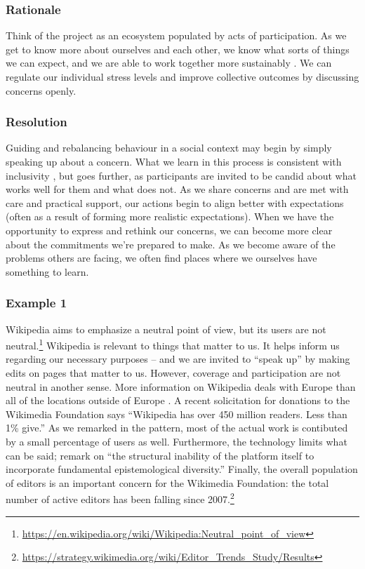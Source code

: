 \subsubsection*{Rationale}

Think of the project as an ecosystem populated by acts of participation.  As we get to know more about ourselves and each other, we know what sorts of things we can expect, and we are able to work together more sustainably \cite{ostrom2010revising}.
%
We can regulate our individual stress levels and improve collective outcomes by discussing concerns openly.

\subsubsection*{Resolution}

Guiding and rebalancing behaviour in a social context may begin by simply speaking up about a concern.  What we learn in this process is  consistent with inclusivity \cite{garrison2013toward}, but goes further, as participants are invited to be candid about what works well for them and what does not.
%
As we share concerns and are met with care and practical support, our actions begin to align better with expectations (often as a result of forming more realistic expectations).  When we have the opportunity to express and rethink our concerns, we can become more clear about the commitments we're prepared to make.  As we become aware of the problems others are facing, we often find places where we ourselves have something to learn.

\subsubsection*{Example 1}
Wikipedia aims to emphasize a neutral point of view, but its users are
not neutral.\footnote{\url{https://en.wikipedia.org/wiki/Wikipedia:Neutral_point_of_view}}
Wikipedia is relevant to things that matter to us.  It
helps inform us regarding our necessary purposes -- and we are invited
to ``speak up'' by making edits on pages that matter to us.  However,
coverage and participation are not neutral in another sense.
More information on Wikipedia deals with Europe than
all of the locations outside of Europe \cite{graham2014uneven}.
A recent solicitation for donations to the Wikimedia Foundation
says ``Wikipedia has over 450 million readers.  Less than 1\% give.''
%
As we remarked in the  pattern, most of the
actual work is contibuted by a small percentage of users as well.
%
Furthermore, the technology limits what can be said; 
\cite{graham2014uneven} remark on
``the structural inability of the platform itself to incorporate fundamental epistemological diversity.''
%
Finally, the overall population of editors is an important concern for
the Wikimedia Foundation: the total number of active editors has been
falling since
2007.\footnote{\url{https://strategy.wikimedia.org/wiki/Editor_Trends_Study/Results}}

